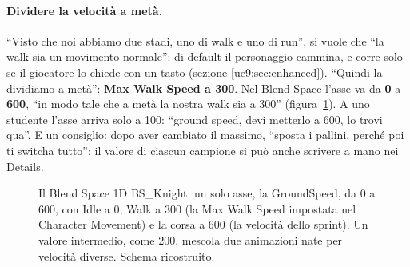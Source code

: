 \paragraph{Dividere la velocità a metà.} ``Visto che noi abbiamo due stadi, uno di walk e
uno di run'', si vuole che ``la walk sia un movimento normale'': di default il personaggio
cammina, e corre solo se il giocatore lo chiede con un tasto (sezione
\ref{ue9:sec:enhanced}). ``Quindi la dividiamo a metà'': \textbf{Max Walk Speed a 300}.
Nel Blend Space l'asse va da \textbf{0} a \textbf{600}, ``in modo tale che a metà la
nostra walk sia a 300'' (figura~\ref{ue9:fig:blend1d}). A uno studente l'asse arriva solo
a 100: ``ground speed, devi metterlo a 600, lo trovi qua''. E un consiglio: dopo aver
cambiato il massimo, ``sposta i pallini, perché poi ti switcha tutto''; il valore di
ciascun campione si può anche scrivere a mano nei Details.

\begin{figure}[htbp]
\centering
{}
\caption{Il Blend Space 1D BS\_Knight: un solo asse, la GroundSpeed, da 0 a 600, con
Idle a 0, Walk a 300 (la Max Walk Speed impostata nel Character Movement) e la corsa a
600 (la velocità dello sprint). Un valore intermedio, come 200, mescola due animazioni
nate per velocità diverse. Schema ricostruito.}
\label{ue9:fig:blend1d}
\end{figure}

